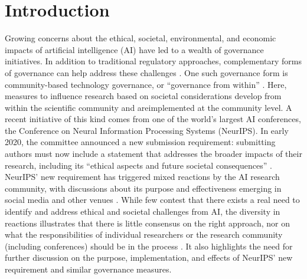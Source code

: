 \documentclass[11pt,english]{article}
\begin{document}
\section{Introduction}
Growing concerns about the ethical, societal, environmental, and economic impacts of artificial intelligence (AI) have led to a wealth of governance initiatives. In addition to traditional regulatory approaches, complementary forms of governance can help address these challenges \citep{winfield_ethical_2018}. One such governance form is community-based technology governance, or ``governance from within'' \citep{fisher_midstream_2006}. Here, measures to influence research based on societal considerations develop from within the scientific community and areimplemented at the community level. A recent initiative of this kind comes from one of the world's largest AI conferences, the Conference on Neural Information Processing Systems (NeurIPS). In early 2020, the committee announced a new submission requirement: submitting authors must now include a statement that addresses the broader impacts of their research, including its ``ethical aspects and future societal consequences'' \citep{neurips_call_2020}. NeurIPS' new requirement has triggered mixed reactions by the AI research community, with discussions about its purpose and effectiveness emerging in social media and other venues \citep{johnson_neurips_2020}. While few contest that there exists a real need to identify and address ethical and societal challenges from AI, the diversity in reactions illustrates that there is little consensus on the right approach, nor on what the responsibilities of individual researchers or the research community (including conferences) should be in the process \citep{brundage_artificial_2016,hecht_its_2018}. It also highlights the need for further discussion on the purpose, implementation, and effects of NeurIPS' new requirement and similar governance measures.
\end{document}
